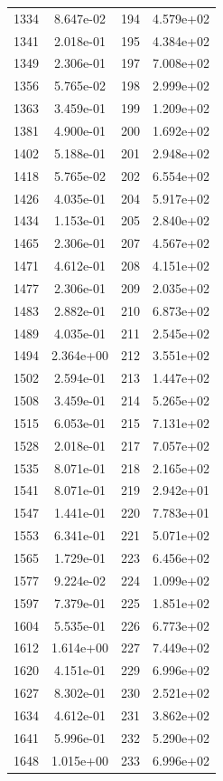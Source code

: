 \documentclass[12pt]{article}
\begin{document}
\begin{longtable}{@{}cccc@{}}
1334 & 8.647e-02 & 194 & 4.579e+02 \\
1341 & 2.018e-01 & 195 & 4.384e+02 \\
1349 & 2.306e-01 & 197 & 7.008e+02 \\
1356 & 5.765e-02 & 198 & 2.999e+02 \\
1363 & 3.459e-01 & 199 & 1.209e+02 \\
1381 & 4.900e-01 & 200 & 1.692e+02 \\
1402 & 5.188e-01 & 201 & 2.948e+02 \\
1418 & 5.765e-02 & 202 & 6.554e+02 \\
1426 & 4.035e-01 & 204 & 5.917e+02 \\
1434 & 1.153e-01 & 205 & 2.840e+02 \\
1465 & 2.306e-01 & 207 & 4.567e+02 \\
1471 & 4.612e-01 & 208 & 4.151e+02 \\
1477 & 2.306e-01 & 209 & 2.035e+02 \\
1483 & 2.882e-01 & 210 & 6.873e+02 \\
1489 & 4.035e-01 & 211 & 2.545e+02 \\
1494 & 2.364e+00 & 212 & 3.551e+02 \\
1502 & 2.594e-01 & 213 & 1.447e+02 \\
1508 & 3.459e-01 & 214 & 5.265e+02 \\
1515 & 6.053e-01 & 215 & 7.131e+02 \\
1528 & 2.018e-01 & 217 & 7.057e+02 \\
1535 & 8.071e-01 & 218 & 2.165e+02 \\
1541 & 8.071e-01 & 219 & 2.942e+01 \\
1547 & 1.441e-01 & 220 & 7.783e+01 \\
1553 & 6.341e-01 & 221 & 5.071e+02 \\
1565 & 1.729e-01 & 223 & 6.456e+02 \\
1577 & 9.224e-02 & 224 & 1.099e+02 \\
1597 & 7.379e-01 & 225 & 1.851e+02 \\
1604 & 5.535e-01 & 226 & 6.773e+02 \\
1612 & 1.614e+00 & 227 & 7.449e+02 \\
1620 & 4.151e-01 & 229 & 6.996e+02 \\
1627 & 8.302e-01 & 230 & 2.521e+02 \\
1634 & 4.612e-01 & 231 & 3.862e+02 \\
1641 & 5.996e-01 & 232 & 5.290e+02 \\
1648 & 1.015e+00 & 233 & 6.996e+02 \\

\end{longtable}
\end{document}
